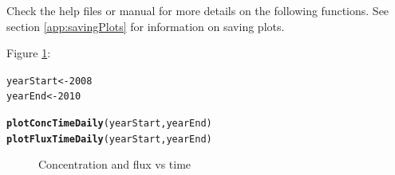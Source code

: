 \documentclass[a4paper,11pt]{article}\usepackage{graphicx, color}
\makeatletter
\newcommand{\hlfunctioncall}[1]{\textcolor[rgb]{0.501960784313725,0,0.329411764705882}{\textbf{#1}}}%
\newenvironment{kframe}{%
 \def\at@end@of@kframe{}%
 \ifinner\ifhmode%
  \def\at@end@of@kframe{\end{minipage}}%
  \begin{minipage}{\columnwidth}%
 \fi\fi%
 \def\FrameCommand##1{\hskip\@totalleftmargin \hskip-\fboxsep
 \colorbox{shadecolor}{##1}\hskip-\fboxsep
     \hskip-\linewidth \hskip-\@totalleftmargin \hskip\columnwidth}%
 \MakeFramed {\advance\hsize-\width
   \@totalleftmargin\z@ \linewidth\hsize
   \@setminipage}}%
 {\par\unskip\endMakeFramed%
 \at@end@of@kframe}
\newenvironment{knitrout}{}{} %
\makeatother
\begin{document}
\FloatBarrier

Check the help files or manual for more details on the following functions.  See section \ref{app:savingPlots} for information on saving plots.






Figure \ref{fig:plotConcTimeDaily}:
\begin{knitrout}
\color{fgcolor}\begin{kframe}
\begin{alltt}
yearStart <- 2008
yearEnd <- 2010

\hlfunctioncall{plotConcTimeDaily}(yearStart, yearEnd)
\hlfunctioncall{plotFluxTimeDaily}(yearStart, yearEnd)
\end{alltt}
\end{kframe}\begin{figure}[]
\caption[Concentration and flux vs time]{Concentration and flux vs time\label{fig:plotConcTimeDaily}}
\end{figure}


\end{knitrout}
\end{document}

